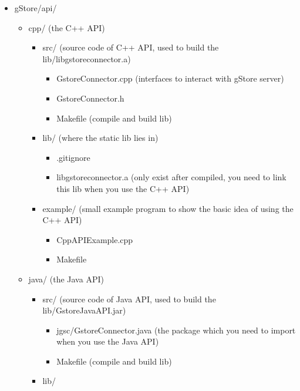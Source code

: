 \documentclass[titlepage, a4paper, 12pt]{article}
\begin{document}
\begin{itemize}
\item
  gStore/api/

  \begin{itemize}
  \item
    cpp/ (the C++ API)

    \begin{itemize}
    \item
      src/ (source code of C++ API, used to build the
      lib/libgstoreconnector.a)

      \begin{itemize}
      \item
        GstoreConnector.cpp (interfaces to interact with gStore server)
      \item
        GstoreConnector.h
      \item
        Makefile (compile and build lib)
      \end{itemize}
    \item
      lib/ (where the static lib lies in)

      \begin{itemize}
      \item
        .gitignore
      \item
        libgstoreconnector.a (only exist after compiled, you need to
        link this lib when you use the C++ API)
      \end{itemize}
    \item
      example/ (small example program to show the basic idea of using
      the C++ API)

      \begin{itemize}
      \item
        CppAPIExample.cpp
      \item
        Makefile
      \end{itemize}
    \end{itemize}
  \item
    java/ (the Java API)

    \begin{itemize}
    \item
      src/ (source code of Java API, used to build the
      lib/GstoreJavaAPI.jar)

      \begin{itemize}
      \item
        jgsc/GstoreConnector.java (the package which you need to import when you use the Java API)
      \item
        Makefile (compile and build lib)
      \end{itemize}
    \item
      lib/


\end{itemize}
\end{itemize}
\end{itemize}
\end{document}
